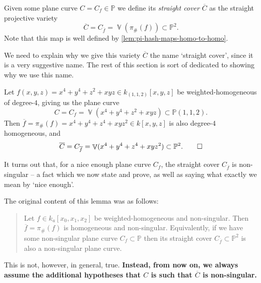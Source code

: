 \documentclass[10pt,notitlepage]{article}
\numberwithin{equation}{subsection}
\DeclareMathOperator{\van}{\mathbb{V}}
\newcommand{\pee}{\mathbb{P}}
\newcommand{\cover}[1]{\overline{#1}}
\newcommand{\kathree}{k_a[x_0,x_1,x_2]}
\begin{document}
        \begin{definition}
            Given some plane curve $C=C_f\in\pee$ we define its \emph{straight cover $\cover{C}$} as the straight projective variety
            \[
                \cover{C} = C_{\cover{f}} = \van(\pi_\#(f))\subset\pee^2.
            \]
            Note that this map is well defined by \cref{lem:pi-hash-maps-homo-to-homo}.
        \end{definition}

        We need to explain why we give this variety $\cover{C}$ the name `straight cover', since it is a very suggestive name.
        The rest of this section is sort of dedicated to showing why we use this name.

        \begin{example}
            Let $f(x,y,z)=x^4+y^4+z^2+xyz\in k_{(1,1,2)}[x,y,z]$ be weighted-homogeneous of degree-$4$, giving us the plane curve
            \[
                C = C_f = \van(x^4+y^4+z^2+xyz) \subset \pee(1,1,2).
            \]
            Then $\cover{f} = \pi_\#(f) = x^4+y^4+z^4+xyz^2\in k[x,y,z]$ is also degree-$4$ homogeneous, and
            \[
                \cover{C} = C_{\cover{f}} = \van(x^4+y^4+z^4+xyz^2) \subset \pee^2.\qedhere
            \]
        \end{example}

        It turns out that, for a nice enough plane curve $C_f$, the straight cover $C_{\cover{f}}$ is non-singular -- a fact which we now state and prove, as well as saying what exactly we mean by `nice enough'.

        \begin{lemma}\label{lem:cover-is-smooth-pc-and-things}
            {\color{purple} The original content of this lemma was as follows:}
            \begin{quote}
            Let $f\in\kathree$ be weighted-homogeneous and non-singular.
            Then $\cover{f}=\pi_\#(f)$ is homogeneous and non-singular.
            Equivalently, if we have some non-singular plane curve $C_f\subset\pee$ then its straight cover $C_{\cover{f}}\subset\pee^2$ is also a non-singular plane curve.
            \end{quote}
            {\color{purple}This is not, however, in general, true. \textbf{Instead, from now on, we always assume the additional hypotheses that $C$ is such that $\cover{C}$ is non-singular.}}
        \end{lemma}
\end{document}

